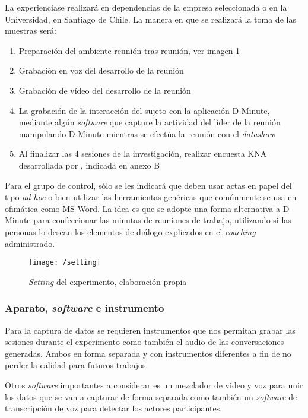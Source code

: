 La experienciase realizará en dependencias de la empresa seleccionada o en la Universidad, en Santiago de Chile. La manera en que se realizará la toma de las muestras será:

\begin{enumerate}[1.]
	\item Preparación del ambiente reunión tras reunión, ver imagen \ref{img5-1}
	\item Grabación en voz del desarrollo de la reunión 
	\item Grabación de vídeo del desarrollo de la reunión
	\item La grabación de la interacción del sujeto con la aplicación D-Minute, mediante algún \textit{software} que capture la actividad del líder de la reunión manipulando D-Minute mientras se efectúa la reunión con el \textit{datashow}
	\item Al finalizar las 4 sesiones de la investigación, realizar encuesta KNA desarrollada por , indicada en anexo B
\end{enumerate}

Para el grupo de control, sólo se les indicará que deben usar actas en papel del tipo \textit{ad-hoc} o bien utilizar las herramientas genéricas que comúnmente se usa en ofimática como MS-Word. La idea es que se adopte una forma alternativa a D-Minute para confeccionar las minutas de reuniones de trabajo, utilizando si las personas lo desean los elementos de diálogo explicados en el \textit{coaching} administrado.

\begin{figure}[h]
\centering
\texttt{[image: /setting]}
\caption{\textit{Setting} del experimento,  elaboración propia} 
\label{img5-1}
\end{figure}

\subsubsection{Aparato, \textit{software} e instrumento}

Para la captura de datos se requieren instrumentos que nos permitan grabar las sesiones durante el experimento como también el audio de las conversaciones generadas. Ambos en forma separada y con instrumentos diferentes a fin de no perder la calidad para futuros trabajos. 

Otros \textit{software} importantes a considerar es un mezclador de video y voz para unir los datos que se van a capturar de forma separada como también un \textit{software} de transcripción de voz para detectar los actores participantes.


